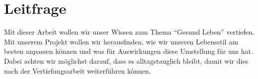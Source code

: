 \chapter{Leitfrage}
\authortoc{\dario}{\chapterident}
Mit dieser Arbeit wollen wir unser Wissen zum Thema “Gesund Leben” vertiefen. 
\newline
Mit unserem Projekt wollen wir herausfinden, wie wir unseren Lebensstil am besten anpassen können und was für Auswirkungen diese Umstellung für uns hat.
\newline
Dabei achten wir möglichst darauf, dass es alltagstauglich bleibt, damit wir dies nach der Vertiefungsarbeit weiterführen können.